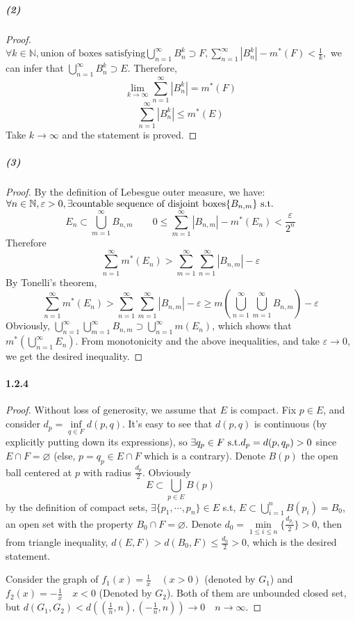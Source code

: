 \documentclass{article}
\begin{document}
\subparagraph{(2)}
\begin{proof}
$\forall k\in\mathbb{N},\text{union of boxes satisfying} \bigcup\limits_{n=1}^{\infty}B^k_n \supset F, \sum\limits_{n=1}^{\infty}|B^k_n|-m^*(F)<\frac 1 k,$ we can infer that $ \bigcup\limits_{n=1}^{\infty}B^k_n\supset E$. Therefore,  
\[\lim_{k\to\infty}\sum_{n=1}^{\infty}|B^k_n|=m^*(F)\]
\[\sum_{n=1}^{\infty}|B^k_n|\leq m^*(E) \]
Take $k\to\infty$ and the statement is proved.
\end{proof}
\subparagraph{(3)}
\begin{proof}
By the definition of Lebesgue outer measure, we have:
$\forall n\in\mathbb{N},\varepsilon>0, \exists \text{countable sequence of disjoint boxes} \{B_{n,m}\} \text{ s.t.}$
\[E_n\subset \bigcup_{m=1}^{\infty}B_{n,m}\qquad 0\leq\sum_{m=1}^{\infty}|B_{n,m}|-m^*(E_n)<\frac{\varepsilon}{2^n}\]
Therefore
\[\sum_{n=1}^{\infty}m^*(E_n)> \sum_{m=1}^{\infty}\sum_{n=1}^{\infty}|B_{n,m}|-\varepsilon\]
By Tonelli's theorem, 
\[\sum_{n=1}^{\infty}m^*(E_n)> \sum_{n=1}^{\infty}\sum_{m=1}^{\infty}|B_{n,m}|-\varepsilon\geq m(\bigcup_{n=1}^{\infty}\bigcup_{m=1}^{\infty}B_{n,m})-\varepsilon\]
Obviously, $\bigcup\limits_{n=1}^{\infty}\bigcup\limits_{m=1}^{\infty}B_{n,m}\supset \bigcup\limits_{n=1}^{\infty}m(E_n)$, which shows that $m^*(\bigcup\limits_{n=1}^{\infty}E_n)$.
From monotonicity and the above inequalities, and take $\varepsilon\to 0$, we get the desired inequality.
\end{proof}

\paragraph{1.2.4}
\begin{proof}
Without loss of generosity, we assume that $E$ is compact. Fix $p\in E$, and consider $d_p=\inf\limits_{q\in F}d(p,q) $. It's easy to see that $d(p,q)$ is continuous (by explicitly putting down its expressions), so $\exists q_p\in F\text{ s.t.} d_p=d(p,q_p)>0$ since $E\cap F=\varnothing$ (else, $p=q_p\in E\cap F$ which is a contrary). Denote $B(p)$ the open ball centered at $p$ with radius $\frac{d_p}{2}$. Obviously
\[E\subset\bigcup_{p\in E}B(p)\]
by the definition of compact sets, $\exists \{p_1,\cdots,p_n\}\in E$ s.t, $E\subset\bigcup\limits_{i=1}^{n}B(p_i)=B_0$, an open set with the property $B_0\cap F=\varnothing$. 
Denote $d_0=\min\limits_{1\leq i\leq n}\{\frac{d_{p_i}}{2}\}>0$, then from triangle inequality, $d(E,F)>d(B_0,F)\leq \frac{d_0}{2}>0$, which is the desired statement.

Consider the graph of $f_1(x)=\frac{1}{x} \quad (x>0)$ (denoted by $G_1$) and $f_2(x)=-\frac{1}{x}\quad x<0$ (Denoted by $G_2$). Both of them are unbounded closed set, but $d(G_1,G_2)<d((\frac{1}{n},n),(-\frac{1}{n},n))\to 0\quad n\to\infty$. 
\end{proof}
\end{document}
